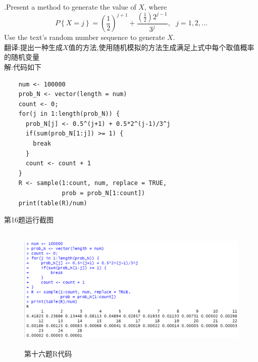 \documentclass{book}
\begin{document}
\hspace*{\fill} \\

.Present a method to generate the value of $X$, where \\
$$
  P\left\{X=j\right\} = (\frac{1}{2})^{j+1} + \frac{(\frac{1}{2})2^{j-1}}{3^{j}},
  \ \ \ j = 1,2,...
$$
Use the text's random number sequence to generate $X$. \\
\noindent
翻译:提出一种生成$X$值的方法,使用随机模拟的方法生成满足上式中每个取值概率的随机变量  \\
解:代码如下
\lstset{language = R}
\begin{lstlisting}
    num <- 100000
    prob_N <- vector(length = num)
    count <- 0;
    for(j in 1:length(prob_N)) {
      prob_N[j] <- 0.5^(j+1) + 0.5*2^(j-1)/3^j
      if(sum(prob_N[1:j]) >= 1) {
        break
      }
      count <- count + 1
    }
    R <- sample(1:count, num, replace = TRUE,
                prob = prob_N[1:count])
    print(table(R)/num)
\end{lstlisting}
第16题运行截图
\begin{figure}[H]
  \centering
  \includegraphics*[height = 6cm, width = 12.2cm]{gramFile/第十六题运行截图.PNG}
  \caption{第十六题R代码}
\end{figure}

\hspace*{\fill} \\
\end{document}

